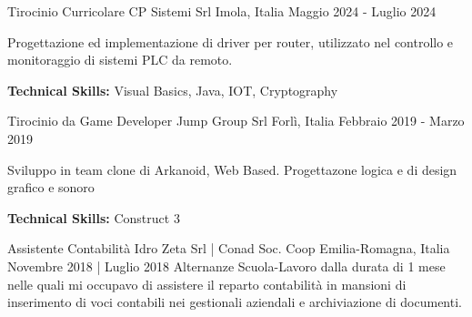 

\begin{cventries}

    \cventry
    {Tirocinio Curricolare} %
    {CP Sistemi Srl} %
    {Imola, Italia} %
    {Maggio 2024 - Luglio 2024} %
    {
      \begin{cvitems} %
        \item {Progettazione ed implementazione di driver per router, utilizzato nel controllo e monitoraggio di sistemi PLC da remoto.}
        \item {\textbf{Technical Skills:} Visual Basics, Java, IOT, Cryptography}
      \end{cvitems}
    }

    \cventry
    {Tirocinio da Game Developer} %
    {Jump Group Srl} %
    {Forlì, Italia} %
    {Febbraio 2019 - Marzo 2019} %
    {
      \begin{cvitems} %
        \item {Sviluppo in team clone di Arkanoid, Web Based. Progettazone logica e di design grafico e sonoro}
        \item {\textbf{Technical Skills:} Construct 3}
      \end{cvitems}
    }

    \cventry
    {Assistente Contabilità} %
    {Idro Zeta Srl | Conad Soc. Coop} %
    {Emilia-Romagna, Italia} %
    {Novembre 2018 | Luglio 2018} %
    {Alternanze Scuola-Lavoro dalla durata di 1 mese nelle quali mi occupavo di assistere il reparto contabilità in mansioni di inserimento di voci contabili nei gestionali aziendali e archiviazione di documenti.}

\end{cventries}
